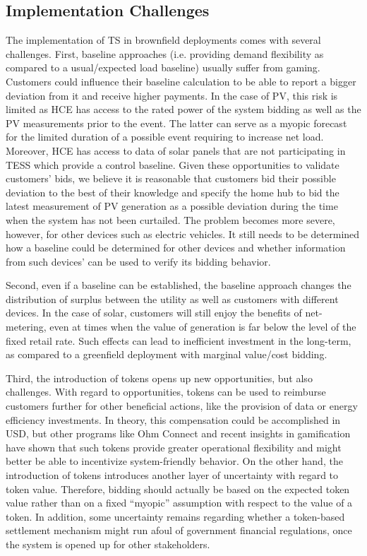 \documentclass[12pt]{article}{Definitions/mdpi}
\begin{document}
\subsection{Implementation Challenges}\label{sec:impl_challenges}

The implementation of TS in brownfield deployments comes with several challenges.
First, baseline approaches (i.e. providing demand flexibility as compared to a usual/expected load baseline) usually suffer from gaming. Customers could influence their baseline calculation to be able to report a bigger deviation from it and receive higher payments. In the case of PV, this risk is limited as HCE has access to the rated power of the system bidding as well as the PV measurements prior to the event. The latter can serve as a myopic forecast for the limited duration of a possible event requiring to increase net load. Moreover, HCE has access to data of solar panels that are not participating in TESS which provide a control baseline. Given these opportunities to validate customers' bids, we believe it is reasonable that customers bid their possible deviation to the best of their knowledge and specify the home hub to bid the latest measurement of PV generation as a possible deviation during the time when the system has not been curtailed. 
The problem becomes more severe, however, for other devices such as electric vehicles. It still needs to be determined how a baseline could be determined for other devices and whether information from such devices'  can be used to verify its bidding behavior.

Second, even if a baseline can be established, the baseline approach changes the distribution of surplus between the utility as well as customers with different devices. In the case of solar, customers will still enjoy the benefits of net-metering, even at times when the value of generation is far below the level of the fixed retail rate. Such effects can lead to inefficient investment in the long-term, as compared to a greenfield deployment with marginal value/cost bidding.

Third, the introduction of tokens opens up new opportunities, but also challenges. 
With regard to opportunities, tokens can be used to reimburse customers further for other beneficial actions, like the provision of data or energy efficiency investments. In theory, this compensation could be accomplished in USD, but other programs like Ohm Connect \citep{OhmConnect2020} and recent insights in gamification have shown that such tokens provide greater operational flexibility and might better be able to incentivize system-friendly behavior.
On the other hand, the introduction of tokens introduces another layer of uncertainty with regard to token value. Therefore, bidding should actually be based on the expected token value rather than on a fixed ``myopic'' assumption with respect to the value of a token.
In addition, some uncertainty remains regarding whether a token-based settlement mechanism might run afoul of government financial regulations, once the system is opened up for other stakeholders.
\end{document}
